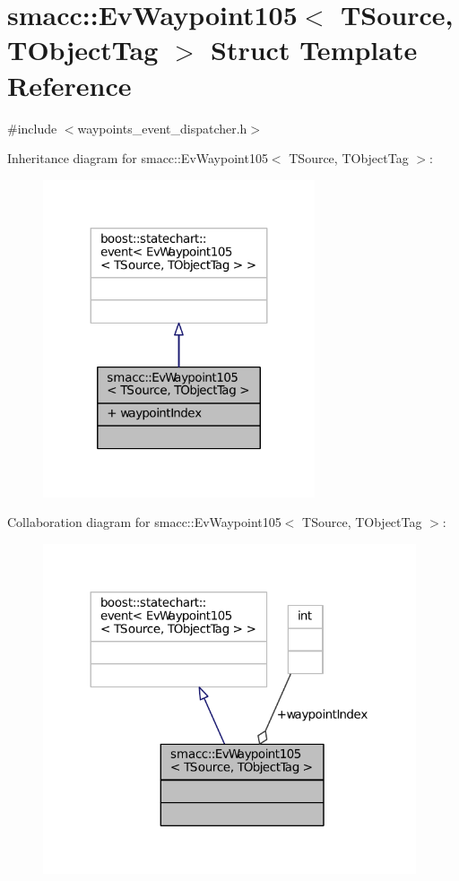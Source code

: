 \hypertarget{structsmacc_1_1EvWaypoint105}{}\section{smacc\+:\+:Ev\+Waypoint105$<$ T\+Source, T\+Object\+Tag $>$ Struct Template Reference}
\label{structsmacc_1_1EvWaypoint105}


{\ttfamily \#include $<$waypoints\+\_\+event\+\_\+dispatcher.\+h$>$}



Inheritance diagram for smacc\+:\+:Ev\+Waypoint105$<$ T\+Source, T\+Object\+Tag $>$\+:
\nopagebreak
\begin{figure}[H]
\begin{center}
\leavevmode
\includegraphics[width=227pt]{structsmacc_1_1EvWaypoint105__inherit__graph}
\end{center}
\end{figure}


Collaboration diagram for smacc\+:\+:Ev\+Waypoint105$<$ T\+Source, T\+Object\+Tag $>$\+:
\nopagebreak
\begin{figure}[H]
\begin{center}
\leavevmode
\includegraphics[width=312pt]{structsmacc_1_1EvWaypoint105__coll__graph}
\end{center}
\end{figure}
